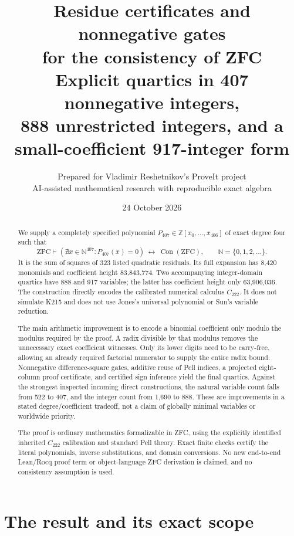 \documentclass[10pt,letterpaper]{article}
\title{\vspace{-1em}\textbf{Residue certificates and nonnegative gates\\for the consistency of ZFC}\\[0.6em]
\large Explicit quartics in 407 nonnegative integers,\\888 unrestricted integers, and a small-coefficient 917-integer form}
\author{Prepared for Vladimir Reshetnikov's ProveIt project\\\small AI-assisted mathematical research with reproducible exact algebra}
\date{24 October 2026}
\theoremstyle{definition}\newtheorem{definition}[theorem]{Definition}
\theoremstyle{remark}\newtheorem{remark}[theorem]{Remark}
\newcommand{\N}{\mathbb N}\newcommand{\Z}{\mathbb Z}\newcommand{\Q}{\mathbb Q}
\newcommand{\ZFC}{\mathrm{ZFC}}\newcommand{\ZF}{\mathrm{ZF}}
\newcommand{\Con}{\operatorname{Con}}\newcommand{\Prf}{\operatorname{Prf}}
\newcommand{\Pn}{P_{407}}\newcommand{\Pz}{Q_{888}}\newcommand{\Ps}{Q_{917}}
\begin{document}
\maketitle
\begin{abstract}
We supply a completely specified polynomial $\Pn\in\Z[x_0,\ldots,x_{406}]$
of exact degree four such that
\[
 \ZFC\vdash
 \left(\nexists x\in\N^{407}:\Pn(x)=0\right)\ \longleftrightarrow\ \Con(\ZFC),
 \qquad\N=\{0,1,2,\ldots\}.
\]
It is the sum of squares of 323 listed quadratic residuals. Its full
expansion has 8,420 monomials and coefficient height 83,843,774.
Two accompanying integer-domain quartics have 888 and 917 variables;
the latter has coefficient height only 63,906,036.
The construction directly encodes the calibrated numerical calculus
$C_{222}$. It does not simulate K215 and does not use Jones's universal
polynomial or Sun's variable reduction.

The main arithmetic improvement is to encode a binomial coefficient only
modulo the modulus required by the proof. A radix divisible by that modulus
removes the unnecessary exact coefficient witnesses. Only its lower digits
need to be carry-free, allowing an already required factorial numerator
to supply the entire radix bound. Nonnegative difference-square gates,
additive reuse of Pell indices, a projected eight-column proof certificate,
and certified sign inference yield the final quartics.
Against the strongest inspected incoming direct constructions, the natural
variable count falls from 522 to 407, and the integer count from 1,690 to
888. These are improvements in a stated degree/coefficient tradeoff, not
a claim of globally minimal variables or worldwide priority.

The proof is ordinary mathematics formalizable in ZFC, using the explicitly
identified inherited $C_{222}$ calibration and standard Pell theory. Exact
finite checks certify the literal polynomials, inverse substitutions, and
domain conversions. No new end-to-end Lean/Rocq proof term or object-language
ZFC derivation is claimed, and no consistency assumption is used.
\end{abstract}

\clearpage
\tableofcontents
\newpage
\section{The result and its exact scope}
\label{sec:result}
\end{document}

